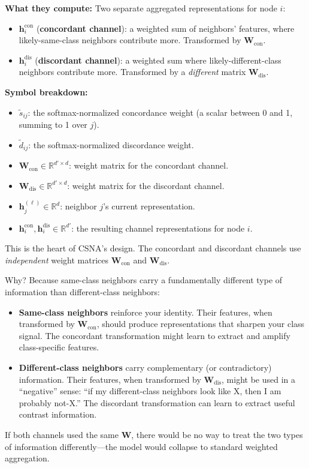 \documentclass[11pt,a4paper]{article}
\newcommand{\R}{\mathbb{R}}
\newcommand{\bW}{\mathbf{W}}
\newcommand{\bh}{\mathbf{h}}
\theoremstyle{definition}
\theoremstyle{plain}
\begin{document}
\textbf{What they compute:}
Two separate aggregated representations for node $i$:
\begin{itemize}
  \item $\bh_i^{\text{con}}$ (\textbf{concordant channel}): a weighted sum of
    neighbors' features, where likely-same-class neighbors contribute more.
    Transformed by $\bW_{\text{con}}$.
  \item $\bh_i^{\text{dis}}$ (\textbf{discordant channel}): a weighted sum where
    likely-different-class neighbors contribute more.
    Transformed by a \emph{different} matrix $\bW_{\text{dis}}$.
\end{itemize}

\textbf{Symbol breakdown:}
\begin{itemize}
  \item $\tilde{s}_{ij}$: the softmax-normalized concordance weight (a scalar
    between 0 and 1, summing to 1 over $j$).
  \item $\tilde{d}_{ij}$: the softmax-normalized discordance weight.
  \item $\bW_{\text{con}} \in \R^{d' \times d}$: weight matrix for the concordant
    channel.
  \item $\bW_{\text{dis}} \in \R^{d' \times d}$: weight matrix for the discordant
    channel.
  \item $\bh_j^{(\ell)} \in \R^d$: neighbor $j$'s current representation.
  \item $\bh_i^{\text{con}}, \bh_i^{\text{dis}} \in \R^{d'}$: the resulting
    channel representations for node $i$.
\end{itemize}

\begin{keyidea}[title=Why Two DIFFERENT Weight Matrices Matter]
This is the heart of CSNA's design. The concordant and discordant channels use
\emph{independent} weight matrices $\bW_{\text{con}}$ and $\bW_{\text{dis}}$.

Why? Because same-class neighbors carry a fundamentally different type of
information than different-class neighbors:

\begin{itemize}[nosep]
  \item \textbf{Same-class neighbors} reinforce your identity. Their features,
    when transformed by $\bW_{\text{con}}$, should produce representations that
    sharpen your class signal. The concordant transformation might learn to
    extract and amplify class-specific features.

  \item \textbf{Different-class neighbors} carry complementary (or
    contradictory) information. Their features, when transformed by
    $\bW_{\text{dis}}$, might be used in a ``negative'' sense: ``if my
    different-class neighbors look like X, then I am probably not-X.''
    The discordant transformation can learn to extract useful contrast
    information.
\end{itemize}

If both channels used the same $\bW$, there would be no way to treat the two
types of information differently---the model would collapse to standard
weighted aggregation.
\end{keyidea}
\end{document}
